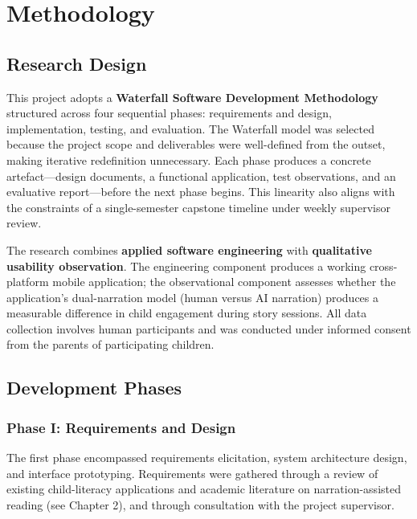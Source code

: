 
\chapter{Methodology}

\section{Research Design}

This project adopts a \textbf{Waterfall Software Development Methodology} structured across four sequential phases: requirements and design, implementation, testing, and evaluation. The Waterfall model was selected because the project scope and deliverables were well-defined from the outset, making iterative redefinition unnecessary. Each phase produces a concrete artefact—design documents, a functional application, test observations, and an evaluative report—before the next phase begins. This linearity also aligns with the constraints of a single-semester capstone timeline under weekly supervisor review.

The research combines \textbf{applied software engineering} with \textbf{qualitative usability observation}. The engineering component produces a working cross-platform mobile application; the observational component assesses whether the application's dual-narration model (human versus AI narration) produces a measurable difference in child engagement during story sessions. All data collection involves human participants and was conducted under informed consent from the parents of participating children.

\section{Development Phases}

\subsection{Phase I: Requirements and Design}

The first phase encompassed requirements elicitation, system architecture design, and interface prototyping. Requirements were gathered through a review of existing child-literacy applications and academic literature on narration-assisted reading (see Chapter 2), and through consultation with the project supervisor.

